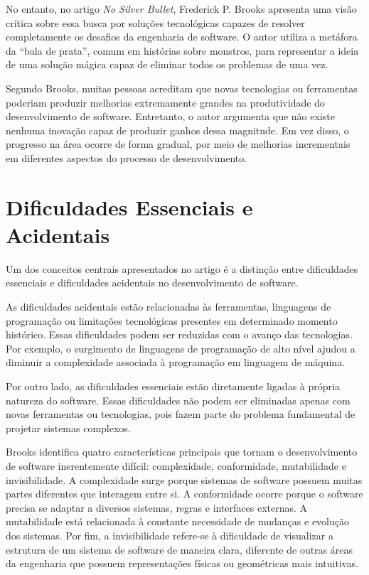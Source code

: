 \documentclass[conference]{IEEEtran}
\begin{document}
No entanto, no artigo \textit{No Silver Bullet}, Frederick P. Brooks apresenta uma visão crítica sobre essa busca por soluções tecnológicas capazes de resolver completamente os desafios da engenharia de software. O autor utiliza a metáfora da ``bala de prata'', comum em histórias sobre monstros, para representar a ideia de uma solução mágica capaz de eliminar todos os problemas de uma vez.

Segundo Brooks, muitas pessoas acreditam que novas tecnologias ou ferramentas poderiam produzir melhorias extremamente grandes na produtividade do desenvolvimento de software. Entretanto, o autor argumenta que não existe nenhuma inovação capaz de produzir ganhos dessa magnitude. Em vez disso, o progresso na área ocorre de forma gradual, por meio de melhorias incrementais em diferentes aspectos do processo de desenvolvimento.

\section{Dificuldades Essenciais e Acidentais}

Um dos conceitos centrais apresentados no artigo é a distinção entre dificuldades essenciais e dificuldades acidentais no desenvolvimento de software.

As dificuldades acidentais estão relacionadas às ferramentas, linguagens de programação ou limitações tecnológicas presentes em determinado momento histórico. Essas dificuldades podem ser reduzidas com o avanço das tecnologias. Por exemplo, o surgimento de linguagens de programação de alto nível ajudou a diminuir a complexidade associada à programação em linguagem de máquina.

Por outro lado, as dificuldades essenciais estão diretamente ligadas à própria natureza do software. Essas dificuldades não podem ser eliminadas apenas com novas ferramentas ou tecnologias, pois fazem parte do problema fundamental de projetar sistemas complexos.

Brooks identifica quatro características principais que tornam o desenvolvimento de software inerentemente difícil: complexidade, conformidade, mutabilidade e invisibilidade. A complexidade surge porque sistemas de software possuem muitas partes diferentes que interagem entre si. A conformidade ocorre porque o software precisa se adaptar a diversos sistemas, regras e interfaces externas. A mutabilidade está relacionada à constante necessidade de mudanças e evolução dos sistemas. Por fim, a invisibilidade refere-se à dificuldade de visualizar a estrutura de um sistema de software de maneira clara, diferente de outras áreas da engenharia que possuem representações físicas ou geométricas mais intuitivas.
\end{document}

